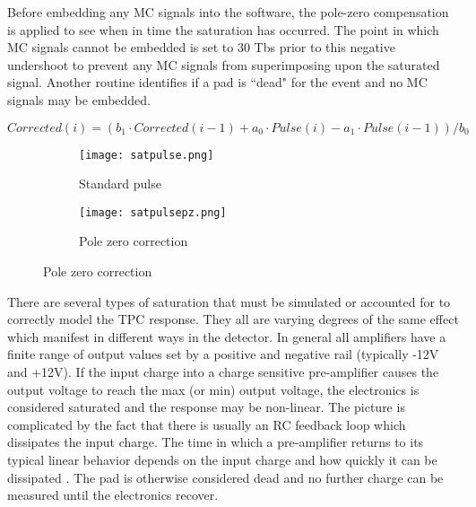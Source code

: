 Before embedding any MC signals into the software, the pole-zero compensation is applied to see when in time the saturation has occurred. The point in which MC signals cannot be embedded is set to 30 Tbs prior to this negative undershoot to prevent any MC signals from superimposing upon the saturated signal. Another routine identifies if a pad is ``dead" for the event and no MC signals may be embedded. 


\begin{equation}
Corrected(i) = (b_1\cdot Corrected(i-1) + a_0\cdot Pulse(i) - a_1\cdot Pulse(i-1))/b_0
\end{equation}



\begin{figure}[!htb]
    \centering
    \begin{subfigure}[t]{0.49\textwidth}
        \centering
        \texttt{[image: satpulse.png]} 
        \caption{Standard pulse } \label{fig:pulsea}
    \end{subfigure}
    \hfill
    \begin{subfigure}[t]{0.49\textwidth}
        \centering
        \texttt{[image: satpulsepz.png]} 
        \caption{Pole zero correction} \label{fig:pulseb}
    \end{subfigure}
\label{fig:pulse}
\end{figure}











There are several types of saturation that must be simulated or accounted for to correctly model the TPC response. They all are varying degrees of the same effect which manifest in different ways in the detector. In general all amplifiers have a finite range of output values set by a positive and negative rail (typically -12V and +12V). If the input charge into a charge sensitive pre-amplifier causes the output voltage to reach the max (or min) output voltage, the electronics is considered saturated and the response may be non-linear. The picture is complicated by the fact that there is usually an RC feedback loop which dissipates the input charge. The time in which a pre-amplifier returns to its typical linear behavior depends on the input charge and how quickly it can be dissipated \cite{akiGET}. The pad is otherwise considered dead and no further charge can be measured until the electronics recover. 
 
